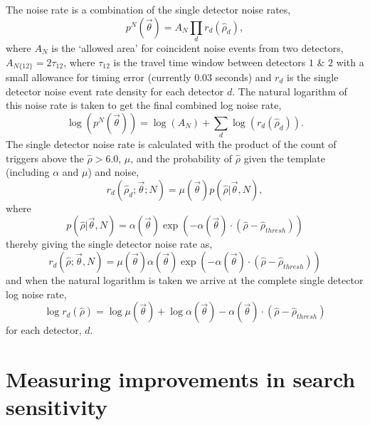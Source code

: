 The noise rate is a combination of the single detector noise rates,
%
\begin{equation}
    p^{N}(\Vec{\theta}) = A_{N} \prod_{d} r_{d}(\hat{\rho}_{d}),
\label{5:eqn:comb-noise-rate}
\end{equation}
%
where $A_{N}$ is the `allowed area' for coincident noise events from two detectors, $A_{N\{12\}} = 2\tau_{12}$, where $\tau_{12}$ is the \gwadj travel time window between detectors $1$ \& $2$ with a small allowance for timing error (currently $0.03$ seconds) and $r_{d}$ is the single detector noise event rate density for each detector $d$. The natural logarithm of this noise rate is taken to get the final combined log noise rate,
%
\begin{equation}
    \log(p^{N}(\Vec{\theta})) = \log(A_{N}) +  \sum_{d} \log(r_{d}(\hat{\rho}_{d})) .
\label{5:eqn:comb-log-noise-rate}
\end{equation}
%
The single detector noise rate is calculated with the product of the count of triggers above the $\hat{\rho} > 6.0$, $\mu$, and the probability of $\hat{\rho}$ given the template (including $\alpha$ and $\mu$) and noise,
%
\begin{equation}
    r_{d}(\hat{\rho}_{d}; {\Vec{\theta}}; N) = \mu(\Vec{\theta}) p(\hat{\rho} | \Vec{\theta}, N) ,
\label{5:eqn:single-noise-rate}
\end{equation}
%
where
%
\begin{equation}
    p(\hat{\rho} | \Vec{\theta}, N) = \alpha(\Vec{\theta}) \exp\left(-\alpha(\Vec{\theta})\cdot\left(\hat{\rho} - \hat{\rho}_{thresh}\right)\right)
\label{5:eqn:p-definition}
\end{equation}
%
thereby giving the single detector noise rate as,
%
\begin{equation}
    r_{d}(\hat{\rho}; {\Vec{\theta}}, N) = \mu(\Vec{\theta}) \alpha(\Vec{\theta}) \exp\left(-\alpha(\Vec{\theta}) \cdot (\hat{\rho} - \hat{\rho}_{thresh})\right)
\label{5:eqn:single-noise-rate-full}
\end{equation}
%
and when the natural logarithm is taken we arrive at the complete single detector log noise rate,
%
\begin{equation}
    \log r_{d}(\hat{\rho}) = \log\mu(\Vec{\theta}) +  \log\alpha(\Vec{\theta}) - \alpha(\Vec{\theta}) \cdot(\hat{\rho} - \hat{\rho}_{thresh})
\label{5:eqn:single-log-noise-rate}
\end{equation}
%
for each detector, $d$.

\section{\label{5:sec:injection-tests}Measuring improvements in search sensitivity}

